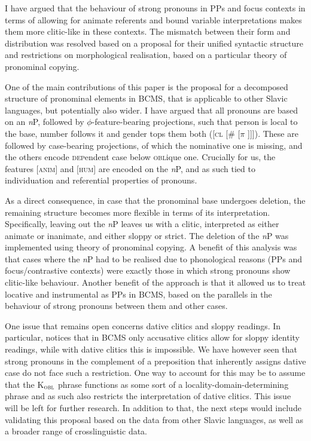 \documentclass[output=paper,colorlinks,citecolor=brown]{langscibook}
\begin{document}
I have argued that the behaviour of strong pronouns in PPs and focus contexts in terms of allowing for animate referents and bound variable interpretations makes them more clitic-like in these contexts. The mismatch between their form and distribution was resolved based on a proposal for their unified syntactic structure and restrictions on morphological realisation, based on a particular theory of pronominal copying. 

One of the main contributions of this paper is the proposal for a decomposed structure of pronominal elements in BCMS, that is applicable to other Slavic languages, but potentially also wider. I have argued that all pronouns are based on an \textit{n}P, followed by $\phi$-feature-bearing projections, such that person is local to the base, number follows it and gender tops them both ([\textsc{cl} [\# [$\pi$ ]]]). These are followed by case-bearing projections, of which the nominative one is missing, and the others encode \textsc{dep}endent case below \textsc{obl}ique one. Crucially for us, the features [\textsc{anim}] and [\textsc{hum}] are encoded on the \textit{n}P, and as such tied to individuation and referential properties of pronouns. 

As a direct consequence, in case that the pronominal base undergoes deletion, the remaining structure becomes more flexible in terms of its interpretation. Specifically, leaving out the \textit{n}P leaves us with a clitic, interpreted as either animate or inanimate, and either sloppy or strict. The deletion of the \textit{n}P was implemented using  theory of pronominal copying. A benefit of this analysis was that cases where the \textit{n}P had to be realised due to phonological reasons (PPs and focus/contrastive contexts) were exactly those in which strong pronouns show clitic-like behaviour. Another benefit of the approach is that it allowed us to treat locative and instrumental as PPs in BCMS, based on the parallels in the behaviour of strong pronouns between them and other cases.  

One issue that remains open concerns dative clitics and sloppy readings. In particular, \citet{runic14} notices that in BCMS only accusative clitics allow for sloppy identity readings, while with dative clitics this is impossible. We have however seen that strong pronouns in the complement of a preposition that inherently assigns dative case do not face such a restriction. One way to account for this may be to assume that the K$_{\textsc{obl}}$ phrase functions as some sort of a locality-domain-determining phrase and as such also restricts the interpretation of dative clitics. This issue will be left for further research. In addition to that, the next steps would include validating this proposal based on the data from other Slavic languages, as well as a broader range of crosslinguistic data. 
\end{document}
